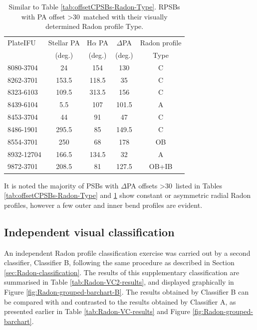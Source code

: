 \begin{table}
\centering
\caption[RPSBs with PA offset \textgreater 30\textdegree\ matched with their visually determined Radon profile Type]{Similar to Table \ref{tab:offsetCPSBs-Radon-Type}. RPSBs with PA offset \textgreater 30\textdegree\ matched with their visually determined Radon profile Type.}
\label{tab:offsetRPSBs-Radon-Type}
\begin{tabular}{lcccc}
\hline
PlateIFU   & Stellar PA & H$\alpha$ PA & $\Delta$PA & Radon profile \\
  & (deg.) & (deg.) & (deg.) & Type\\
\hline
8080-3704 & 24 & 154 & 130 & C \\
8262-3701 & 153.5 & 118.5 & 35 & C \\
8323-6103 & 109.5 & 313.5 & 156 & C \\
8439-6104 & 5.5 & 107 & 101.5 & A \\
8453-3704 & 44 & 91 & 47 & C \\
8486-1901 & 295.5 & 85 & 149.5 & C \\
8554-3701 & 250 & 68 & 178 & OB \\
8932-12704 & 166.5 & 134.5 & 32 & A \\
9872-3701 & 208.5 & 81 & 127.5 & OB+IB \\
\hline
\end{tabular}
\end{table}

It is noted the majority of PSBs with $\Delta$PA offsets \textgreater 30\textdegree\ listed in Tables \ref{tab:offsetCPSBs-Radon-Type} and \ref{tab:offsetRPSBs-Radon-Type} show constant or asymmetric radial Radon profiles, however a few outer and inner bend profiles are evident. 

\subsection{Independent visual classification}
\label{independent-classification}
An independent Radon profile classification exercise was carried out by a second classifier, Classifier B, following the same procedure as described in Section \ref{sec:Radon-classification}. The results of this supplementary classification are summarised in Table \ref{tab:Radon-VC2-results}, and displayed graphically in Figure \ref{fig:Radon-grouped-barchart-B}. The results obtained by Classifier B can be compared with and contrasted to the results obtained by Classifier A, as presented earlier in Table \ref{tab:Radon-VC-results} and Figure \ref{fig:Radon-grouped-barchart}.

